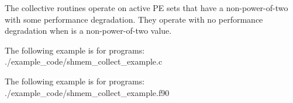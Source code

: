 \begin{apidefinition}
{    The collective routines operate on active \ac{PE} sets that have a
    non-power-of-two  with some performance degradation.  They operate
    with no performance degradation when  is a non-power-of-two value.
}

\begin{apiexamples}

\apicexample
    {The following  example is for \CorCpp{} programs:}
    {./example_code/shmem_collect_example.c}
    {}

\apifexample
    {The following  example is for \Fortran programs:}
    {./example_code/shmem_collect_example.f90}
    {}

\end{apiexamples}

\end{apidefinition}
